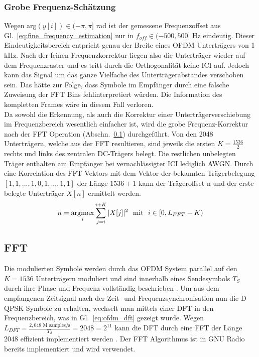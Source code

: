 \subsubsection{Grobe Frequenz-Schätzung}
Wegen arg$(y[i]) \in (-\pi,\pi]$ rad ist der gemessene Frequenzoffset aus Gl.~\ref{eq:fine_frequency_estimation} nur in $f_{off} \in (-500,500]$ Hz eindeutig. Dieser Eindeutigkeitsbereich entpricht genau der Breite eines OFDM Unterträgers von 1 kHz. Nach der feinen Frequenzkorrektur liegen also die Unterträger wieder auf dem Frequenzraster und es tritt durch die Orthogonalität keine ICI auf. Jedoch kann das Signal um das ganze Vielfache des Unterträgerabstandes verschoben sein. Das hätte zur Folge, dass Symbole im Empfänger durch eine falsche Zuweisung der FFT Bins fehlinterpretiert würden. Die Information des kompletten Frames wäre in diesem Fall verloren.\\
Da sowohl die Erkennung, als auch die Korrektur einer Unterträgerverschiebung im Frequenzbereich wesentlich einfacher ist, wird die grobe Frequenz-Korrektur nach der FFT Operation (Abschn.~\ref{sec:FFT}) durchgeführt.
Von den 2048 Unterträgern, welche aus der FFT resultieren, sind jeweils die ersten $K = \frac{1536}{2}$ rechts und links des zentralen DC-Trägers belegt. Die restlichen unbelegten Träger enthalten am Empfänger bei vernachlässigter \ac{ICI} lediglich \ac{AWGN}. Durch eine Korrelation des FFT Vektors mit dem Vektor der bekannten Trägerbelegung $[1,1,...,1,0,1,...,1,1]$ der Länge $1536+1$ kann der Trägeroffset n und der erste belegte Unterträger $X[n]$ ermittelt werden.
\begin{equation}
n = \operatorname*{\arg\!\max}_i \sum \limits_{j=i}^{i+K} |X[j]|^2 \ \ \text{mit} \ \ i \in [0,L_{FFT}-K)
\end{equation}

\subsection{FFT}
\label{sec:FFT}
Die modulierten Symbole werden durch das OFDM System parallel auf den $K=1536$ Unterträgern moduliert und sind innerhalb eines Sendesymbols $T_S$ durch ihre Phase und Frequenz vollständig beschrieben \cite{nt1}. Um aus dem empfangenen Zeitsignal nach der Zeit- und Frequenzsynchronisation nun die D-QPSK Symbole zu erhalten, wechselt man mittels einer \ac{DFT} in den Frequenzbereich, was in Gl.~\ref{eq:ofdm_dft} gezeigt wurde. Wegen $L_{DFT} = \frac{2,048 \text{ M samples/s}}{T_S} = 2048 = 2^{11}$ kann die \ac{DFT} durch eine \ac{FFT} der Länge 2048 effizient implementiert werden \cite{fft:sus}. Der \ac{FFT} Algorithmus ist in GNU Radio \cite{repo:gr-fft} bereits implementiert und wird verwendet.

